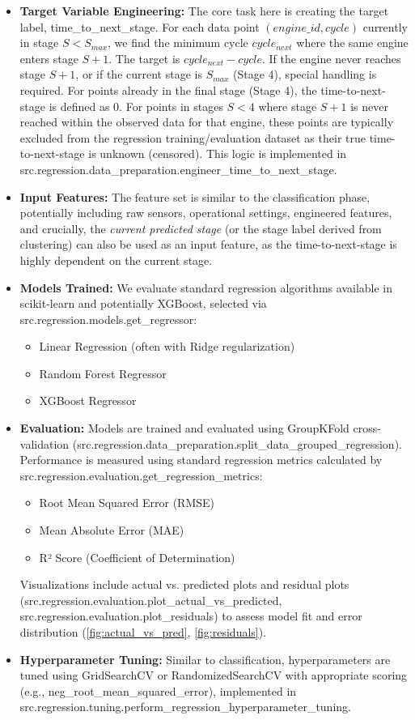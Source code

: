 \begin{itemize}
	\item \textbf{Target Variable Engineering:} The core task here is creating the target label, time\_to\_next\_stage. For each data point $(engine\_id, cycle)$ currently in stage $S < S_{max}$, we find the minimum cycle $cycle_{next}$ where the same engine enters stage $S+1$. The target is $cycle_{next} - cycle$. If the engine never reaches stage $S+1$, or if the current stage is $S_{max}$ (Stage 4), special handling is required. For points already in the final stage (Stage 4), the time-to-next-stage is defined as 0. For points in stages $S < 4$ where stage $S+1$ is never reached within the observed data for that engine, these points are typically excluded from the regression training/evaluation dataset as their true time-to-next-stage is unknown (censored). This logic is implemented in src.regression.data\_preparation.engineer\_time\_to\_next\_stage.
	\item \textbf{Input Features:} The feature set is similar to the classification phase, potentially including raw sensors, operational settings, engineered features, and crucially, the \textit{current predicted stage} (or the stage label derived from clustering) can also be used as an input feature, as the time-to-next-stage is highly dependent on the current stage.
	\item \textbf{Models Trained:} We evaluate standard regression algorithms available in scikit-learn and potentially XGBoost, selected via src.regression.models.get\_regressor:
	      \begin{itemize}
		      \item Linear Regression (often with Ridge regularization)
		      \item Random Forest Regressor
		      \item XGBoost Regressor
	      \end{itemize}
	\item \textbf{Evaluation:} Models are trained and evaluated using GroupKFold cross-validation (src.regression.data\_preparation.split\_data\_grouped\_regression). Performance is measured using standard regression metrics calculated by src.regression.evaluation.get\_regression\_metrics:
	      \begin{itemize}
		      \item Root Mean Squared Error (RMSE)
		      \item Mean Absolute Error (MAE)
		      \item R² Score (Coefficient of Determination)
	      \end{itemize}
	      Visualizations include actual vs. predicted plots and residual plots (src.regression.evaluation.plot\_actual\_vs\_predicted, src.regression.evaluation.plot\_residuals) to assess model fit and error distribution (\cref{fig:actual_vs_pred}, \cref{fig:residuals}).
	\item \textbf{Hyperparameter Tuning:} Similar to classification, hyperparameters are tuned using GridSearchCV or RandomizedSearchCV with appropriate scoring (e.g., neg\_root\_mean\_squared\_error), implemented in src.regression.tuning.perform\_regression\_hyperparameter\_tuning.
\end{itemize}

